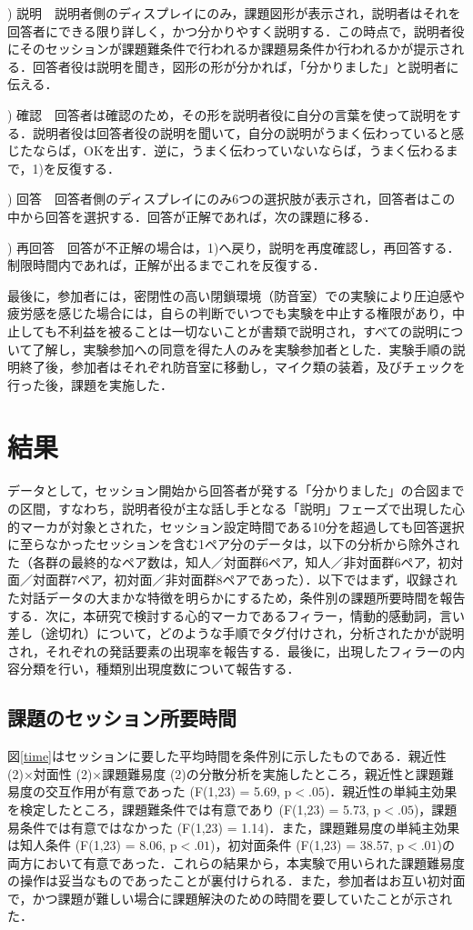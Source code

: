 \documentclass[japanese]{jnlp_1.3a}
\begin{document}
) 説明　説明者側のディスプレイにのみ，課題図形が表示され，説明者はそれを回答者にできる限り詳しく，かつ分かりやすく説明する．この時点で，説明者役にそのセッションが課題難条件で行われるか課題易条件か行われるかが提示される．回答者役は説明を聞き，図形の形が分かれば，「分かりました」と説明者に伝える．

) 確認　回答者は確認のため，その形を説明者役に自分の言葉を使って説明をする．説明者役は回答者役の説明を聞いて，自分の説明がうまく伝わっていると感じたならば，OKを出す．逆に，うまく伝わっていないならば，うまく伝わるまで，1)を反復する．

) 回答　回答者側のディスプレイにのみ6つの選択肢が表示され，回答者はこの中から回答を選択する．回答が正解であれば，次の課題に移る．

) 再回答　回答が不正解の場合は，1)へ戻り，説明を再度確認し，再回答する．制限時間内であれば，正解が出るまでこれを反復する．

最後に，参加者には，密閉性の高い閉鎖環境（防音室）での実験により圧迫感や疲労感を感じた場合には，自らの判断でいつでも実験を中止する権限があり，中止しても不利益を被ることは一切ないことが書類で説明され，すべての説明について了解し，実験参加への同意を得た人のみを実験参加者とした．実験手順の説明終了後，参加者はそれぞれ防音室に移動し，マイク類の装着，及びチェックを行った後，課題を実施した．

\section{結果}

データとして，セッション開始から回答者が発する「分かりました」の合図までの区間，すなわち，説明者役が主な話し手となる「説明」フェーズで出現した心的マーカが対象とされた，セッション設定時間である10分を超過しても回答選択に至らなかったセッションを含む1ペア分のデータは，以下の分析から除外された（各群の最終的なペア数は，知人／対面群6ペア，知人／非対面群6ペア，初対面／対面群7ペア，初対面／非対面群8ペアであった）．以下ではまず，収録された対話データの大まかな特徴を明らかにするため，条件別の課題所要時間を報告する．次に，本研究で検討する心的マーカであるフィラー，情動的感動詞，言い差し（途切れ）について，どのような手順でタグ付けされ，分析されたかが説明され，それぞれの発話要素の出現率を報告する．最後に，出現したフィラーの内容分類を行い，種類別出現度数について報告する．

\subsection{課題のセッション所要時間}
図\ref{time}はセッションに要した平均時間を条件別に示したものである．親近性 (2)×対面性 (2)×課題難易度 (2)の分散分析を実施したところ，親近性と課題難易度の交互作用が有意であった (F(1,23) = 5.69, $\mathrm{p}<.05$)．親近性の単純主効果を検定したところ，課題難条件では有意であり (F(1,23) = 5.73, $\mathrm{p} < .05$)，課題易条件では有意ではなかった (F(1,23) = 1.14)．また，課題難易度の単純主効果は知人条件 (F(1,23) = 8.06, $\mathrm{p} < .01$)，初対面条件 (F(1,23) = 38.57, $\mathrm{p} < .01$)の両方において有意であった．これらの結果から，本実験で用いられた課題難易度の操作は妥当なものであったことが裏付けられる．また，参加者はお互い初対面で，かつ課題が難しい場合に課題解決のための時間を要していたことが示された．
\end{document}
